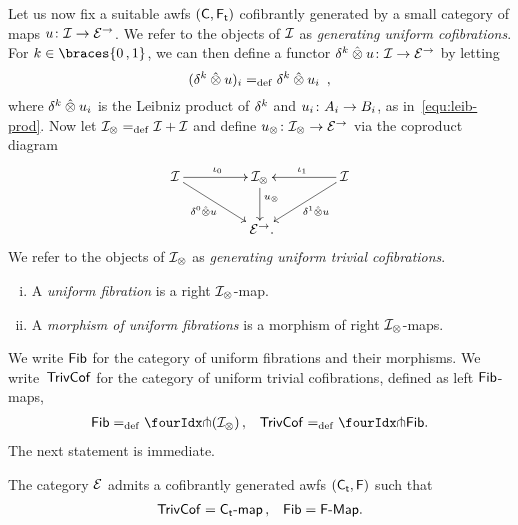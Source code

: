 \documentclass[reqno,10pt,a4paper,oneside,draft]{amsart}
\begin{document}
{{Let us now fix a suitable awfs $(\CC, \TF)$ cofibrantly generated by a small category of maps $u \co \cal{I} \to \cal{E}^\to$.
We refer to the objects of $\cal{I}$ as \emph{generating uniform cofibrations}.
For $k \in \braces{0\,, 1}$, we can then define a functor $\kcyl \hatotimes u \co \cal{I} \to \catE^\to$ by letting
\[
(\kcyl \hatotimes u)_i \defeq \kcyl \hatotimes u_i  \ \, , 
\]
where $\kcyl \hatotimes u_i$ is the Leibniz product of $\kcyl$ and $u_i \co A_i \to B_i$, as in~\eqref{equ:leib-prod}.
Now let $\cal{I}_\otimes \defeq \cal{I} + \cal{I}$ and define $u_\otimes \co \cal{I}_\otimes \to \catE^\to$ via the coproduct diagram
\begin{equation} \label{equ:u-tensor}
\begin{gathered}
\xymatrix@C+2em{
  \cal{I}
  \ar[r]^{\iota_0}
  \ar[dr]_-{\lcyl \hatotimes u}
&
  \cal{I}_\otimes
  \ar[d]^(.4){u_\otimes}
&
  \cal{I}
  \ar[dl]^-{\rcyl \hatotimes u}
  \ar[l]_{\iota_1}
\\&
  \catE^\to
\rlap{.}}
\end{gathered}
\end{equation}
We refer to the objects of $\cal{I}_\otimes$ as \emph{generating uniform trivial cofibrations}.

\begin{definition} \label{def:I-fibration} \leavevmode
\begin{enumerate}[(i)]
\item A \emph{uniform fibration} is a right $\cal{I}_\otimes$-map.
\item A \emph{morphism of uniform fibrations} is a morphism of right $\cal{I}_\otimes$-maps.
\end{enumerate}
\end{definition}

We write $\Fib$ for the category of uniform fibrations and their morphisms.
We write~$\TrivCof$ for the category of uniform trivial cofibrations, defined as left $\Fib$-maps, \ie 
\[
\begin{aligned}
\Fib \defeq \liftr{(\cal{I}_\otimes)} \, , 
&&
\TrivCof \defeq \liftl{\Fib}
.\end{aligned}
\]
The next statement is immediate.

\begin{theorem} \label{thm:sset-cset-nwfs}
The category $\cal{E}$ admits a cofibrantly generated awfs $(\TC, \FF)$ such that
\[
\begin{aligned}
\TrivCof =  \pcoalg{\TC} \, ,
&&
\Fib = \pAlg{\FF}
.\end{aligned}
\]
\end{theorem}

}}
\end{document}
